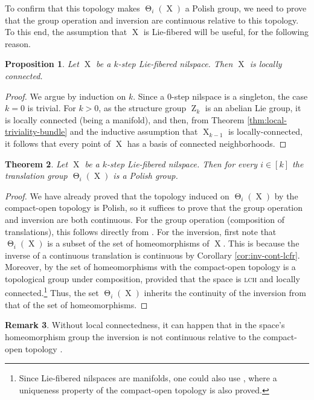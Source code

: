 \documentclass[a4paper,12pt,reqno]{amsart}
\newtheorem{theorem}{Theorem}[section]
\newtheorem{proposition}[theorem]{Proposition}
\theoremstyle{definition}
\newtheorem{remark}[theorem]{Remark}
\DeclareMathOperator{\ab}{Z}
\DeclareMathOperator{\tran}{\Theta}
\DeclareMathOperator{\ns}{X}
\begin{document}
To confirm that this topology makes $\tran_i(\ns)$ a Polish group, we need to prove that the group operation and inversion are continuous relative to this topology. To this end, the assumption that $\ns$ is Lie-fibered will be useful, for the following reason.
\begin{proposition}
Let $\ns$ be a $k$-step Lie-fibered nilspace. Then $\ns$ is locally connected.
\end{proposition}

\begin{proof}
We argue by induction on $k$. Since a 0-step nilspace is a singleton, the case $k=0$ is trivial. For $k>0$, as the structure group $\ab_k$ is an abelian Lie group, it is locally connected (being a manifold), and then, from Theorem \ref{thm:local-triviality-bundle} and the inductive assumption that $\ns_{k-1}$ is locally-connected, it follows that every point of $\ns$ has a basis of connected neighborhoods.
\end{proof}

\begin{theorem}\label{thm:trans-group-polish}
Let $\ns$ be a $k$-step Lie-fibered nilspace. Then for every $i\in [k]$ the translation group $\tran_i(\ns)$ is a Polish group.
\end{theorem}

\begin{proof}
We have already proved that the topology induced on $\tran_i(\ns)$ by the compact-open topology is Polish, so it suffices to prove that the group operation and inversion are both continuous. For the group operation (composition of translations), this follows directly from \cite[\S 46, Ex. 7]{Mu}. For the inversion, first note that $\tran_i(\ns)$ is a subset of the set of homeomorphisms of $\ns$. This is because the inverse of a continuous translation is continuous by Corollary \ref{cor:inv-cont-lcfr}. Moreover, by \cite[Theorem 4]{Ar46} the set of homeomorphisms with the compact-open topology is a topological group under composition, provided that the space is \textsc{lch} and locally connected.\footnote{Since Lie-fibered nilspaces are manifolds, one could also use \cite{Ka}, where a uniqueness property of the compact-open topology is also proved.} Thus, the set $\tran_i(\ns)$ inherits the continuity of the inversion from that of the set of homeomorphisms.
\end{proof}
\begin{remark}
Without local connectedness, it can happen that in the space's homeomorphism group the inversion is not continuous relative to the compact-open topology \cite{Di}.
\end{remark}
\end{document}
